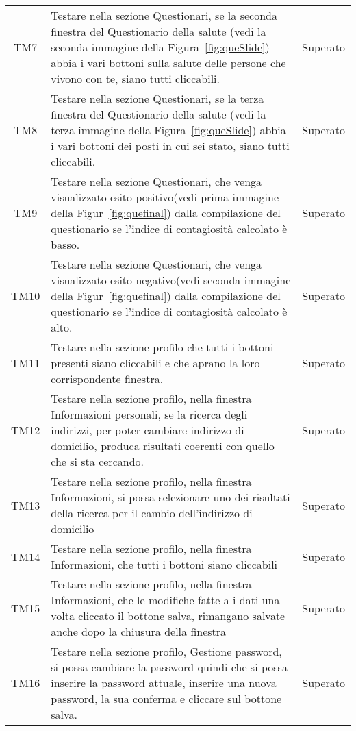 \begin{table}[h]%
	\renewcommand{\arraystretch}{1.4}
	\centering
	\begin{tabularx}{\textwidth}{c X c}
		\hline	
		\rowcolor{heavenly}
		\intest{Codice} &  \intest{Descrizione} & \intest{Esito}\\	
		\hline	
		TM7 & Testare nella sezione Questionari, se la seconda finestra del Questionario della salute (vedi la seconda immagine della Figura~\ref{fig:queSlide}) abbia i vari bottoni sulla salute delle persone che vivono con te, siano tutti cliccabili. & Superato\\
		TM8 & Testare nella sezione Questionari, se la terza finestra del Questionario della salute (vedi la terza immagine della Figura~\ref{fig:queSlide}) abbia i vari bottoni dei posti in cui sei stato, siano tutti cliccabili. & Superato\\
		TM9 & Testare nella sezione Questionari, che venga visualizzato esito positivo(vedi prima immagine della Figur~\ref{fig:quefinal}) dalla compilazione del questionario se l'indice di contagiosità calcolato è basso. & Superato\\
		TM10 & Testare nella sezione Questionari, che venga visualizzato esito negativo(vedi seconda immagine della Figur~\ref{fig:quefinal}) dalla compilazione del questionario se l'indice di contagiosità calcolato è alto. & Superato\\
		TM11 & Testare nella sezione profilo che tutti i bottoni presenti siano cliccabili e che aprano la loro corrispondente finestra. & Superato\\
		TM12 & Testare nella sezione profilo, nella finestra Informazioni personali, se la ricerca degli indirizzi, per poter cambiare indirizzo di domicilio, produca risultati coerenti con quello che si sta cercando. & Superato\\
		TM13 & Testare nella sezione profilo, nella finestra Informazioni, si possa selezionare uno dei risultati della ricerca per il cambio dell'indirizzo di domicilio & Superato\\
		TM14 & Testare nella sezione profilo, nella finestra Informazioni, che tutti i bottoni siano cliccabili & Superato\\
		TM15 & Testare nella sezione profilo, nella finestra Informazioni, che le modifiche fatte a i dati una volta cliccato il bottone salva, rimangano salvate anche dopo la chiusura della finestra & Superato\\
		TM16 & Testare nella sezione profilo, Gestione password, si possa cambiare la password quindi che si possa inserire la password attuale, inserire una nuova password, la sua conferma e cliccare sul bottone salva. & Superato\\

\end{tabularx}
\end{table}
